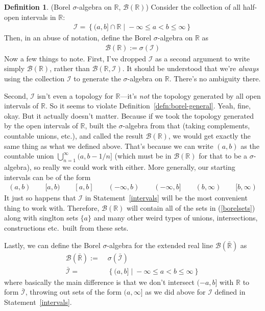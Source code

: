\documentclass[12pt]{article}
\theoremstyle{plain}
\theoremstyle{definition}
\newtheorem{defn}[thm]{Definition}
\theoremstyle{remark}
\newcommand{\sB}{\mathscr{B}}
\newcommand{\sI}{\mathscr{I}}
\newcommand{\R}{\mathbb{R}}
\newcommand{\ninf}{_{n=1}^\infty}
\begin{document}
\begin{defn}(Borel $\sigma$-algebra on $\R$, $\sB(\R)$)
Consider the collection of all half-open intervals in $\R$:
\begin{align}
  \sI = \left\{(a,b] \cap \R \; | \; -\infty\leq a < b \leq \infty\right\}
  \label{intervals}
\end{align}
Then, in an abuse of notation, define the Borel $\sigma$-algebra on $\R$
as
\begin{align*}
  \sB(\R) := \sigma(\sI)
\end{align*}
Now a few things to note. First, I've dropped $\sI$ as a second argument
to write simply $\sB(\R)$, rather than $\sB(\R,\sI)$. It should be
understood that we're \emph{always} using the collection $\sI$ to
generate the $\sigma$-algebra on $\R$. There's no ambiguity there.

Second, $\sI$ isn't even a topology for $\R$---it's \emph{not} the
topology generated by all open intervals of $\R$.
So it seems to violate Definition~\ref{defn:borel-general}.
Yeah, fine, okay. But it actually doesn't matter. Because if we
took the topology generated by the open intervals of $\R$, built the
$\sigma$-algebra from that (taking complements, countable unions,
etc.), and called the result $\sB(\R)$, we would
get exactly the same thing as what we defined above. That's because we
can write $(a,b)$ as the countable union $\bigcup\ninf(a,b-1/n]$ (which
must be in $\sB(\R)$ for that to be a $\sigma$-algebra), so really we
could work with either.  More generally, our starting intervals can be
of the form
\begin{align}
  (a,b)
  \qquad
  [a,b)
  \qquad
  [a,b]
  \qquad
  (-\infty,b)
  \qquad
  (-\infty,b]
  \qquad
  (b,\infty)
  \qquad
  [b,\infty)
  \label{borelsets}
\end{align}
It just so happens that $\sI$ in Statement~\ref{intervals} will be the
most convenient thing to work with.
Therefore, $\sB(\R)$ will contain all of the sets in (\ref{borelsets})
along with singlton sets $\{a\}$ and many other weird types of unions,
intersections, constructions etc.\ built from these sets.

Lastly, we can define the Borel $\sigma$-algebra for the extended real
line $\sB(\bar{\R})$ as
\begin{align*}
  \sB(\bar{\R}) :=& \; \sigma(\bar{\sI}) \\
  \bar{\sI} =& \; \left\{(a,b] \; | \; -\infty\leq a < b \leq \infty\right\}
\end{align*}
where basically the main difference is that we don't intersect
$(-a,b]$ with $\R$ to form $\bar{\sI}$, throwing out sets of the form
$(a,\infty]$ as we did above for $\sI$ defined in
Statement~\ref{intervals}.
\end{defn}
\end{document}
